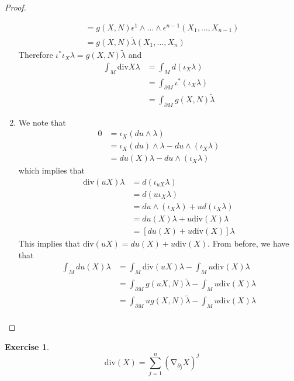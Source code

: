 \documentclass{book}
\theoremstyle{definition}
\newtheorem{ex}[definition]{Exercise}
\newcommand{\ep}{\epsilon}
\newcommand{\lam}{\lambda}
\DeclareMathOperator{\nab}{\nabla}
\DeclareMathOperator*{\0}{\mbf{0}}
\DeclareMathOperator*{\1}{\mbf{1}}
\renewcommand{\div}{\text{div}}
\newcommand{\p}{\partial}
\begin{document}
\begin{proof}
\begin{enumerate}
\begin{align*}
			& = g(X,N) \ep^1 \wedge \ldots \wedge \ep^{n-1}(X_1, \ldots, X_{n-1}) \\
			& =  g(X, N) \tilde{\lam}(X_1, \ldots, X_n) 
		\end{align*}
		Therefore $	\iota^* \iota_X \lam  = g(X,N) \tilde{\lam}$ and 
		\begin{align*}
			\int_M \div X \lam 
			& = \int_M d(\iota_X \lam) \\
			& = \int_{\p M} \iota^* (\iota_X \lam) \\
			& = \int_{\p M} g(X, N) \tilde{\lam}
		\end{align*}
		\item We note that
		\begin{align*}
			0
			& = \iota_X(d u \wedge \lam) \\
			& = \iota_X(du) \wedge \lam - du \wedge (\iota_X \lam) \\
			& = du(X) \lam  - du \wedge (\iota_X \lam) 
		\end{align*} 
		which implies that 
		\begin{align*}
			\div (uX) \lam 
			& = d(\iota_{uX} \lam) \\
			& = d (u \iota_X \lam) \\
			& = du \wedge (\iota_X \lam) + u d(\iota_X \lam ) \\
			& = du(X) \lam + u \div(X) \lam \\
			& = [du(X) + u \div(X)] \lam 
		\end{align*}
		This implies that $	\div (uX) = du(X) + u \div(X)$. From before, we have that 
		\begin{align*}
			\int_M du(X) \lam 
			& = \int_M \div (uX) \lam - \int_M u \div(X) \lam \\
			& = \int_{\p M} g(uX, N) \tilde{\lam} - \int_M u \div(X) \lam \\
			& = \int_{\p M} u g(X, N) \tilde{\lam} - \int_M u \div(X) \lam \\
		\end{align*}
	\end{enumerate}
\end{proof}


\begin{ex}
	$$\div(X) = \sum_{j = 1}^n (\nab_{\p_j} X)^j$$
\end{ex}
\end{document}
